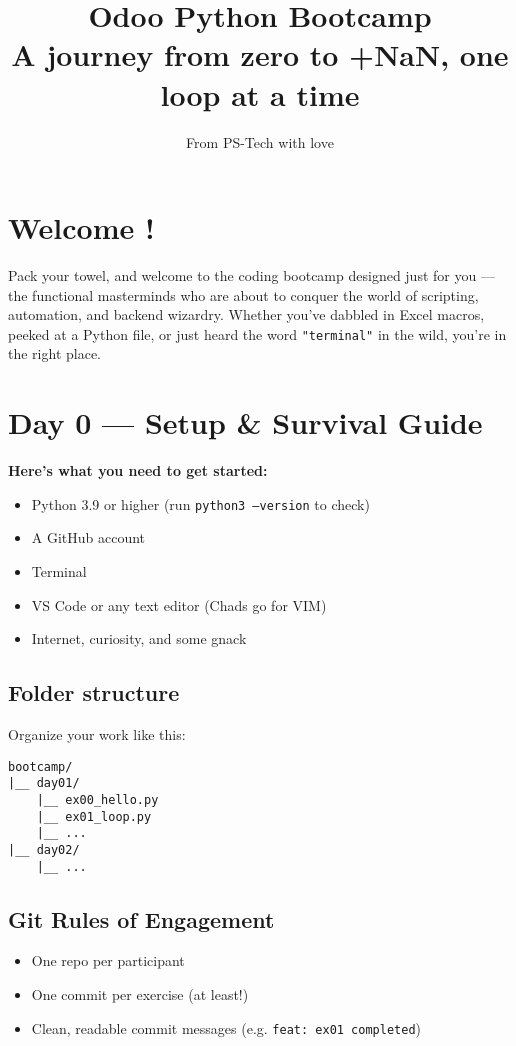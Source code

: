 \documentclass[12pt,a4paper]{article}
\title{\Huge\textbf{Odoo Python Bootcamp} \\[1ex]
\Large A journey from zero to +NaN, one loop at a time}
\author{From PS-Tech with love}
\begin{document}
\maketitle

\section*{Welcome !}
Pack your towel, and welcome to the coding bootcamp designed just for you — the functional masterminds who are about to conquer the world of scripting, automation, and backend wizardry. Whether you've dabbled in Excel macros, peeked at a Python file, or just heard the word \texttt{"terminal"} in the wild, you're in the right place.

\section*{Day 0 — Setup \& Survival Guide}
\textbf{Here's what you need to get started:}
\begin{itemize}
  \item Python 3.9 or higher (run \texttt{python3 --version} to check)
  \item A GitHub account
  \item Terminal
  \item VS Code or any text editor (Chads go for VIM)
  \item Internet, curiosity, and some gnack
\end{itemize}

\subsection*{Folder structure}
Organize your work like this:
\begin{lstlisting}
bootcamp/
|__ day01/
    |__ ex00_hello.py
    |__ ex01_loop.py
    |__ ...
|__ day02/
    |__ ...
\end{lstlisting}

\subsection*{Git Rules of Engagement}
\begin{itemize}
  \item One repo per participant
  \item One commit per exercise (at least!)
  \item Clean, readable commit messages (e.g. \texttt{feat: ex01 completed})
\end{itemize}
\end{document}
